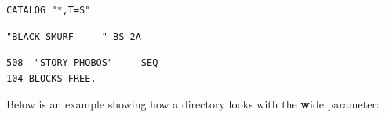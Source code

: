 \begin{description}[leftmargin=2cm,style=nextline]
\begin{tcolorbox}[colback=black,coltext=white]
\verbatimfont{\codefont}
\begin{verbatim}
CATALOG "*,T=S"
\end{verbatim}
\selectfont{\codefont 0}
\begin{tcolorbox}[colback=white,coltext=black,arc=0mm,boxrule=0mm,
       left*=0.5mm,right*=0mm,top=0mm,bottom=0mm,nobeforeafter,
       left skip=0.5mm,
       width=28mm,height=3mm,valign=center]
\begin{verbatim}
"BLACK SMURF     " BS 2A
\end{verbatim}
\end{tcolorbox}
\begin{verbatim}
508  "STORY PHOBOS"     SEQ
104 BLOCKS FREE.
\end{verbatim}
\end{tcolorbox}

Below is an example showing how a directory looks with the {\bf w}ide parameter:
\label{3columndirlisting}


\end{description}
